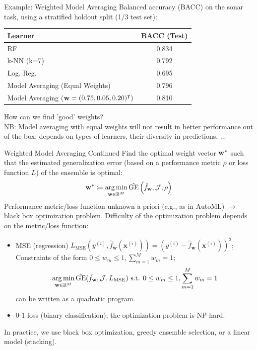 \documentclass[11pt,compress,t,notes=noshow, aspectratio=169, xcolor=table]{beamer}
\begin{document}

\begin{vbframe}{Example: Weighted Model Averaging}
\vfill
Balanced accuracy (BACC) on the sonar task, using a stratified holdout split (1/3 test set):
\vfill
\begin{table}[h]
\centering
\begin{tabular}{lc}
\hline
\textbf{Learner} & \textbf{BACC} (Test) \\
\hline
RF & 0.834 \\
k-NN (k=7) & 0.792 \\
Log. Reg. & 0.695 \\
Model Averaging (Equal Weights) & 0.796 \\
Model Averaging ($\mathbf{w} = (0.75, 0.05, 0.20)^\intercal)$ & 0.810 \\
\hline
\end{tabular}
\label{table:learners_test}
\end{table}
\vfill
How can we find 'good' weights?\\
\vfill
NB: Model averaging with equal weights will not result in better performance out of the box; depends on types of learners, their diversity in predictions, ...
\vfill
\end{vbframe}

\begin{frame}{Weighted Model Averaging Continued}
Find the optimal weight vector $\mathbf{w}^{*}$ such that the estimated generalization error (based on a performance metric $\rho$ or loss function $L$) of the ensemble is optimal:
$$\mathbf{w}^{*} \coloneqq \operatorname*{arg\,min}_{\mathbf{w} \in \mathbb{R}^{M}} \hat{\text{GE}}\left(\hat{f}_{\mathbf{w}}, \mathcal{J}, \rho\right)$$
\vfill
Performance metric/loss function unknown a priori (e.g., as in AutoML) $\rightarrow$ black box optimization problem.
\vfill
Difficulty of the optimization problem depends on the metric/loss function:
\begin{itemize}
    \item MSE (regression) $L_{\mathrm{MSE}}(y^{(i)}, \hat{f}_{\mathbf{w}}(\mathbf{x}^{(i)})) = (y^{(i)} - \hat{f}_{\mathbf{w}}(\mathbf{x}^{(i)}))^{2}$;\\
          Constraints of the form $0 \le w_{m} \le 1, \sum_{m=1}^{M} w_{m} = 1$;\\
          $$\operatorname*{arg\,min}_{\mathbf{w} \in \mathbb{R}^{M}} \hat{\text{GE}}(\hat{f}_{\mathbf{w}}, \mathcal{J}, L_{\mathrm{MSE}}) \text{ s.t. } 0 \le w_{m} \le 1, \sum_{m=1}^{M} w_{m} = 1$$ 
          can be written as a quadratic program.
    \item 0-1 loss (binary classification); the optimization problem is NP-hard.
\end{itemize}
\vfill
In practice, we use black box optimization, greedy ensemble selection, or a linear model (stacking).
\end{frame}
\end{document}

